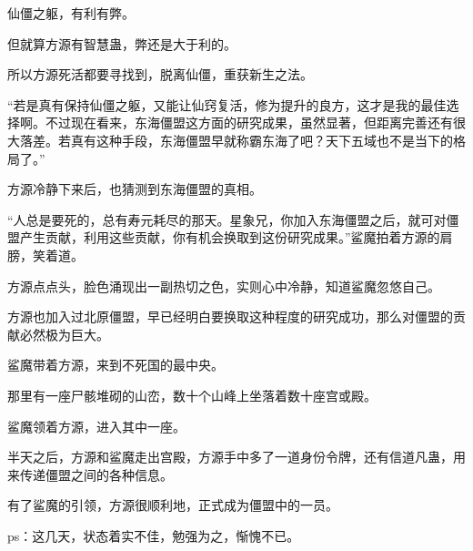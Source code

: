 \begin{this_body}
仙僵之躯，有利有弊。

但就算方源有智慧蛊，弊还是大于利的。

所以方源死活都要寻找到，脱离仙僵，重获新生之法。

“若是真有保持仙僵之躯，又能让仙窍复活，修为提升的良方，这才是我的最佳选择啊。不过现在看来，东海僵盟这方面的研究成果，虽然显著，但距离完善还有很大落差。若真有这种手段，东海僵盟早就称霸东海了吧？天下五域也不是当下的格局了。”

方源冷静下来后，也猜测到东海僵盟的真相。

“人总是要死的，总有寿元耗尽的那天。星象兄，你加入东海僵盟之后，就可对僵盟产生贡献，利用这些贡献，你有机会换取到这份研究成果。”鲨魔拍着方源的肩膀，笑着道。

方源点点头，脸色涌现出一副热切之色，实则心中冷静，知道鲨魔忽悠自己。

方源也加入过北原僵盟，早已经明白要换取这种程度的研究成功，那么对僵盟的贡献必然极为巨大。

鲨魔带着方源，来到不死国的最中央。

那里有一座尸骸堆砌的山峦，数十个山峰上坐落着数十座宫或殿。

鲨魔领着方源，进入其中一座。

半天之后，方源和鲨魔走出宫殿，方源手中多了一道身份令牌，还有信道凡蛊，用来传递僵盟之间的各种信息。

有了鲨魔的引领，方源很顺利地，正式成为僵盟中的一员。

ps：这几天，状态着实不佳，勉强为之，惭愧不已。

\end{this_body}

